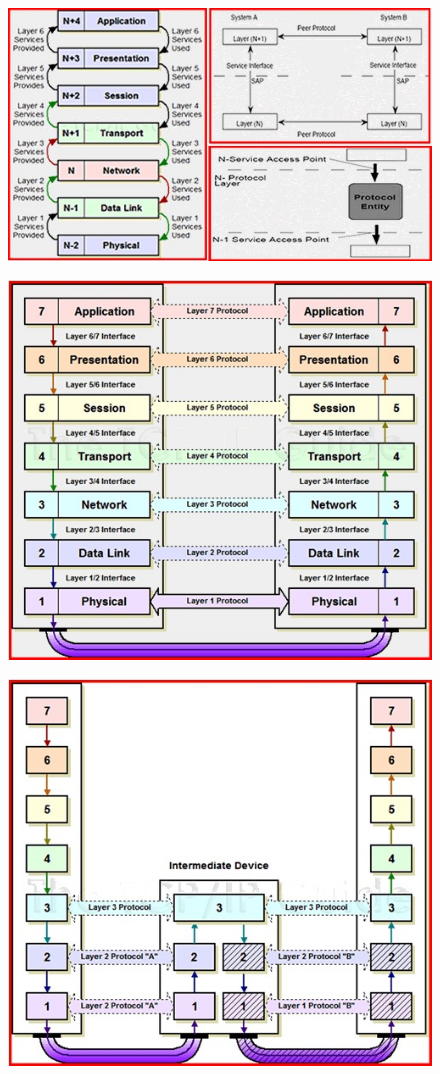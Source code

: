 \begin{figure}[H]
	\centering
	\includegraphics[width=15cm]{partie1/interaction.jpg}
\end{figure}
\begin{figure}[H]
	\centering
	\includegraphics[width=12cm]{partie1/interaction1.jpg}
\end{figure}
\begin{figure}[H]
	\centering
	\includegraphics[width=12cm]{partie1/interaction2.jpg}
\end{figure}
